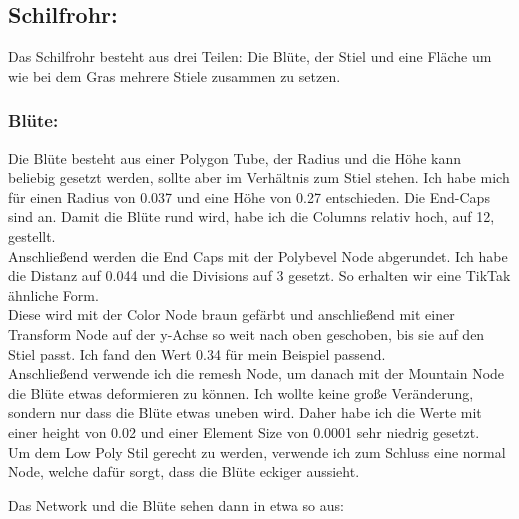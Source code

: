 \documentclass[paper=a4,fontsize=12pt,ngerman]{scrartcl}
\begin{document}
	\subsection*{Schilfrohr:}
	Das Schilfrohr besteht aus drei Teilen: Die Blüte, der Stiel und eine Fläche um wie bei dem Gras mehrere Stiele zusammen zu setzen.
	\subsubsection*{Blüte:}
	Die Blüte besteht aus einer Polygon Tube, der Radius und die Höhe kann beliebig gesetzt werden, sollte aber im Verhältnis zum Stiel stehen. Ich habe mich für einen Radius von 0.037 und eine Höhe von 0.27 entschieden. Die End-Caps sind an. Damit die Blüte rund wird, habe ich die Columns relativ hoch, auf 12, gestellt.\\
	Anschließend werden die End Caps mit der Polybevel Node abgerundet. Ich habe die Distanz auf 0.044 und die Divisions auf 3 gesetzt. So erhalten wir eine TikTak ähnliche Form.\\ 
	Diese wird mit der Color Node braun gefärbt und anschließend mit einer Transform Node auf der y-Achse so weit nach oben geschoben, bis sie auf den Stiel passt. Ich fand den Wert 0.34 für mein Beispiel passend.\\ 
	Anschließend verwende ich die remesh Node, um danach mit der Mountain Node die Blüte etwas deformieren zu können. Ich wollte keine große Veränderung, sondern nur dass die Blüte etwas uneben wird. Daher habe ich die Werte mit einer height von 0.02 und einer Element Size von 0.0001 sehr niedrig gesetzt.\\ 
	Um dem Low Poly Stil gerecht zu werden, verwende ich zum Schluss eine normal Node, welche dafür sorgt, dass die Blüte eckiger aussieht.\\
	\begin{minipage}{0.5\textwidth}
		Das Network und die Blüte sehen dann in etwa so aus:
	\end{minipage}
\end{document}

